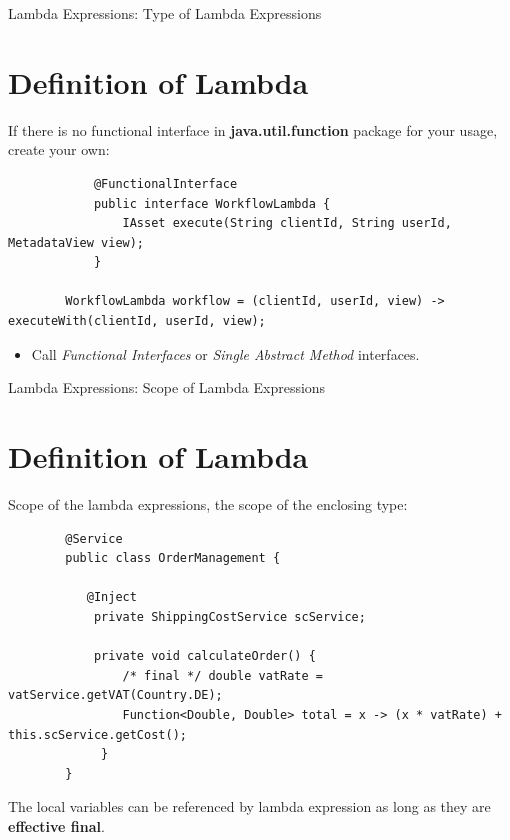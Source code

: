 \documentclass{beamer}
\begin{document}
	\begin{frame}[fragile]{Lambda Expressions: Type of Lambda Expressions}
		\section{Definition of Lambda}
		If there is no functional interface in \textbf{java.util.function} package for your usage, create your own:
		\begin{lstlisting}
			@FunctionalInterface
			public interface WorkflowLambda {
			    IAsset execute(String clientId, String userId, MetadataView view);
			}

		WorkflowLambda workflow = (clientId, userId, view) -> executeWith(clientId, userId, view);
		\end{lstlisting}
		
		\begin{itemize}
			\item Call \textit{Functional Interfaces} or \textit{Single Abstract Method} interfaces.
		\end{itemize}
				
	\end{frame}	


	\begin{frame}[fragile]{Lambda Expressions: Scope of Lambda Expressions}
		\section{Definition of Lambda}
		
		Scope of the lambda expressions, the scope of the enclosing type:
		\begin{lstlisting}
		@Service
		public class OrderManagement {

		   @Inject
  			private ShippingCostService scService;

  			private void calculateOrder() {
    			/* final */ double vatRate = vatService.getVAT(Country.DE);
    			Function<Double, Double> total = x -> (x * vatRate) + this.scService.getCost();
 			 }
		}
		\end{lstlisting}
		
		The local variables can be referenced by lambda expression as long as they are \textbf{effective final}.
	\end{frame}	
	
\end{document}
